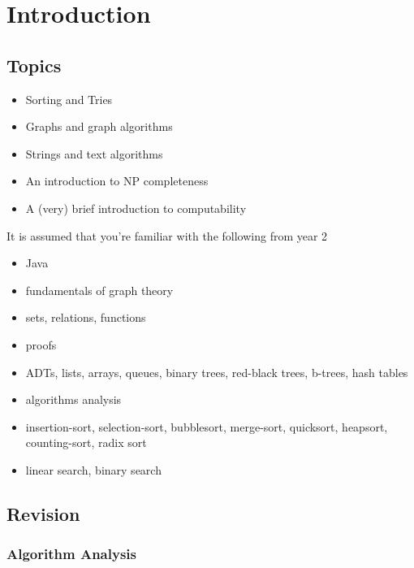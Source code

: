
\section{Introduction}


	\subsection{Topics}

		\begin{itemize}
			\item Sorting and Tries
			\item Graphs and graph algorithms
			\item Strings and text algorithms
			\item An introduction to NP completeness
			\item A (very) brief introduction to computability
		\end{itemize}

		\par{It is assumed that you're familiar with the following from year 2}

		\begin{itemize}
			\item Java
			\item fundamentals of graph theory
			\item sets, relations, functions
			\item proofs
			\item ADTs, lists, arrays, queues, binary trees, red-black trees, b-trees, hash tables
			\item algorithms analysis
			\item insertion-sort, selection-sort, bubblesort, merge-sort, quicksort, heapsort, counting-sort, radix sort
			\item linear search, binary search
		\end{itemize}

\subsection{Revision}



	\subsubsection{Algorithm Analysis}

